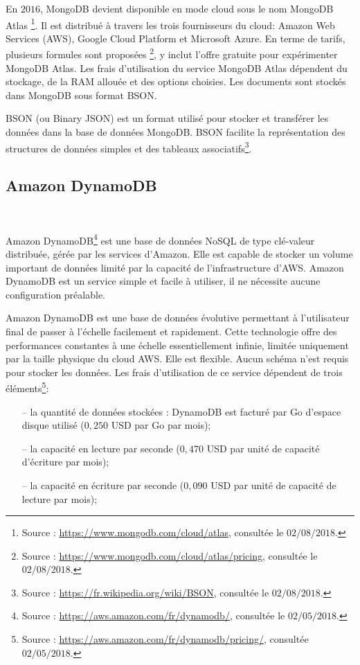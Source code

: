 En $ 2016 $, MongoDB devient disponible en mode cloud sous le nom  MongoDB Atlas \footnote{Source : \url{https://www.mongodb.com/cloud/atlas}, consultée le $ 02/08/2018 $.}.  Il est distribué à travers les trois fournisseurs du cloud: Amazon Web Services (AWS), Google Cloud Platform et Microsoft Azure.  En terme de tarifs, plusieurs formules sont proposées \footnote{Source : \url{https://www.mongodb.com/cloud/atlas/pricing}, consultée le $ 02/08/2018 $.}, y inclut l'offre gratuite pour expérimenter MongoDB Atlas.  Les frais d'utilisation du service MongoDB Atlas dépendent du stockage, de la  RAM allouée et des options choisies. Les documents sont stockés dans MongoDB sous format BSON.
	
\begin{tcolorbox}
	BSON (ou Binary JSON) est un format utilisé pour stocker et transférer les données dans la base de données MongoDB. BSON facilite la représentation des structures de données simples et des tableaux associatifs\footnote{Source : \url{https://fr.wikipedia.org/wiki/BSON}, consultée le $ 02/08/2018 $.}.
\end{tcolorbox}
	
	\subsection{Amazon DynamoDB}\label{aws:dynmo}~
	
	
	Amazon DynamoDB\footnote{Source : \url{https://aws.amazon.com/fr/dynamodb/}, consultée le $02/05/2018$.} est une base de données NoSQL de type clé-valeur distribuée, gérée par les services d'Amazon. Elle est capable de stocker un volume important de données limité par la capacité de l'infrastructure d'AWS. Amazon DynamoDB   est un service  simple et facile à utiliser,  il ne nécessite aucune configuration préalable. 
	
	Amazon DynamoDB  est une base de données évolutive permettant à l'utilisateur final de passer à l'échelle facilement et rapidement. Cette technologie offre des performances constantes à une échelle essentiellement infinie, limitée uniquement par la taille physique du cloud AWS. Elle est flexible. Aucun schéma n'est requis pour stocker les données. Les frais d'utilisation de ce service dépendent de trois éléments\footnote{Source : \url{https://aws.amazon.com/fr/dynamodb/pricing/}, consultée $02/05/2018$.}:
	\begin{itemize}
		\item[--] la quantité de données stockées : DynamoDB est facturé par Go d'espace disque utilisé ($ 0,250 $ USD par Go par mois);
		\item[--] la capacité en lecture par seconde ($ 0,470 $ USD par unité de capacité d'écriture par mois);
		\item[--]  la capacité en écriture par seconde ($ 0,090 $ USD par unité de capacité de lecture par mois);
	\end{itemize}

